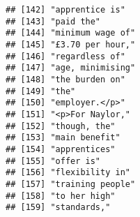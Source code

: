 \documentclass[]{article}
\begin{document}
\begin{verbatim}
## [142] "apprentice is"                                                                                                                            
## [143] "paid the"                                                                                                                                 
## [144] "minimum wage of"                                                                                                                          
## [145] "£3.70 per hour,"                                                                                                                          
## [146] "regardless of"                                                                                                                            
## [147] "age, minimising"                                                                                                                          
## [148] "the burden on"                                                                                                                            
## [149] "the"                                                                                                                                      
## [150] "employer.</p>"                                                                                                                            
## [151] "<p>For Naylor,"                                                                                                                           
## [152] "though, the"                                                                                                                              
## [153] "main benefit"                                                                                                                             
## [154] "apprentices"                                                                                                                              
## [155] "offer is"                                                                                                                                 
## [156] "flexibility in"                                                                                                                           
## [157] "training people"                                                                                                                          
## [158] "to her high"                                                                                                                              
## [159] "standards,"                                                                                                                               

\end{verbatim}
\end{document}
